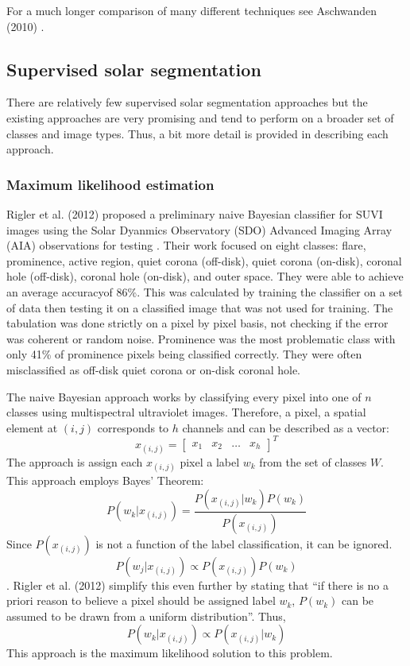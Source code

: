 \documentclass[twoside]{report}
\begin{document}
For a much longer comparison of many different techniques see Aschwanden (2010) \cite{aschwanden:2010}. 

\subsection{Supervised solar segmentation} \label{sec:supervised}
There are relatively few supervised solar segmentation approaches but the existing approaches are very promising and tend to perform on a broader set of classes and image types. Thus, a bit more detail is provided in describing each approach. 

\subsubsection{Maximum likelihood estimation}

Rigler et al. (2012) proposed a preliminary naive Bayesian classifier for SUVI images using the Solar Dyanmics Observatory (SDO) Advanced Imaging Array (AIA) observations for testing \cite{rigler:2012}. Their work focused on eight classes: flare, prominence, active region, quiet corona (off-disk), quiet corona (on-disk), coronal hole (off-disk), coronal hole (on-disk), and outer space. They were able to achieve an average accuracyof 86\%. This was calculated by training the classifier on a set of data then testing it on a classified image that was not used for training. The tabulation was done strictly on a pixel by pixel basis, not checking if the error was coherent or random noise. Prominence was the most problematic class with only 41\% of prominence pixels being classified correctly. They were often misclassified as off-disk quiet corona or on-disk coronal hole.

The naive Bayesian approach works by classifying every pixel into one of $n$ classes using multispectral ultraviolet images. Therefore, a pixel, a spatial element at $(i,j)$ corresponds to $h$ channels and can be described as a vector:
\[ x_{(i,j)} = \begin{bmatrix} x_1 & x_2 & \hdots & x_h \end{bmatrix}^T \]
The approach is assign each $x_{(i,j)}$ pixel a label $w_k$ from the set of classes $W$. This approach employs Bayes' Theorem:
\[ P(w_k | x_{(i,j)}) = \frac{P(x_{(i,j)} | w_k) P(w_k)}{P(x_{(i,j)})} \]
Since $P(x_{(i,j)})$ is not a function of the label classification, it can be ignored.
\[ P(w_j | x_{(i,j)}) \propto P(x_{(i,j)}) P(w_{k}) \].
Rigler et al. (2012) simplify this even further by stating that ``if there is no a priori reason to believe a pixel should be assigned label $w_k$, $P(w_k)$ can be assumed to be drawn from a uniform distribution''. Thus,
\[ P(w_k | x_{(i,j)}) \propto P(x_{(i,j)} | w_k) \]
This approach is the maximum likelihood solution to this problem.
\end{document}
